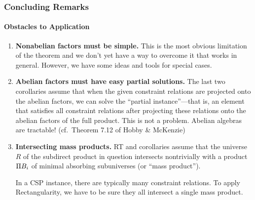 \documentclass[9pt,xcolor=dvipsnames%
   ]{beamer}
\begin{document}
\begin{frame} \frametitle{Concluding Remarks}
  \framesubtitle{Obstacles to Application}

  \begin{enumerate}
  \item<1-> {\bf Nonabelian factors must be simple.}
    This is the most obvious limitation of the theorem and
    we don't yet have a way to overcome it that works in general.
    However, we have some ideas and tools for special cases.

  \item<2-> {\bf Abelian factors must have easy partial solutions.}
    The last two corollaries assume that
    when the given constraint relations are projected onto the abelian factors,
    we can solve the ``partial instance''---that is, an element that satisfies all
    constraint relations after projecting these relations onto the abelian
    factors of the full product. This is not a problem.  Abelian algebras are
    tractable! (cf.~Theorem 7.12 of Hobby \& McKenzie)
    

  \item<3-> {\bf Intersecting mass products.}
    RT and corollaries assume that the universe $R$ of the subdirect
    product in question intersects nontrivially
    with a product $\Pi B_i$ of minimal absorbing subuniverses
    (or ``mass product'').

    \bigskip
    In a CSP instance, there are typically many constraint relations.
    To apply Rectangularity, we have to be sure they all intersect
    a single mass product.
  \end{enumerate}

\end{frame}
\end{document}
